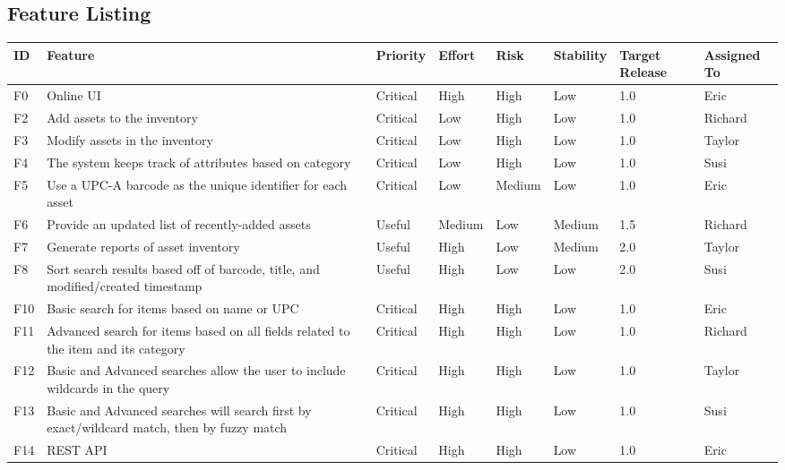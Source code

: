 \documentclass{article}
\begin{document}
\subsection{Feature Listing}
\begin{tabular}{ | p{0.15in} | p{2.0in} | p{0.5in} | p{0.5in} | p{0.5in} | p{0.6in} | p{0.5in} | p{0.65in} | }
\hline
\textbf{ID} & \textbf{Feature}\label{feature} & \textbf{Priority}\label{priority} & \textbf{Effort}\label{effort} & \textbf{Risk}\label{risk} & \textbf{Stability}\label{stability} & \textbf{Target Release}\label{target_release} & \textbf{Assigned To}\label{assigned_to} \\
\hline
\hline
F0 & Online UI & Critical & High & High & Low & 1.0 & Eric \\
\hline
F2 & Add assets to the inventory & Critical & Low & High & Low & 1.0 & Richard \\
\hline
F3 & Modify assets in the inventory & Critical & Low & High & Low & 1.0 & Taylor \\
\hline
F4 & The system keeps track of attributes based on category & Critical & Low & High & Low & 1.0 & Susi \\
\hline
F5 & Use a UPC-A barcode as the unique identifier for each asset\label{upc} & Critical & Low & Medium & Low & 1.0 & Eric \\
\hline
F6 & Provide an updated list of recently-added assets & Useful & Medium & Low & Medium & 1.5 & Richard \\
\hline
F7 & Generate reports of asset inventory & Useful & High & Low & Medium & 2.0 & Taylor \\
\hline
F8 & Sort search results based off of barcode, title, and modified/created timestamp & Useful & High & Low & Low & 2.0 & Susi \\
\hline
F10 & Basic search for items based on name or UPC & Critical & High & High & Low & 1.0 & Eric \\
\hline
F11 & Advanced search for items based on all fields related to the item and its category & Critical & High & High & Low & 1.0 & Richard \\
\hline
F12 & Basic and Advanced searches allow the user to include wildcards in the query & Critical & High & High & Low & 1.0 & Taylor \\
\hline
F13 & Basic and Advanced searches will search first by exact/wildcard match, then by fuzzy match & Critical & High & High & Low & 1.0 & Susi \\
\hline
F14 & REST API & Critical & High & High & Low & 1.0 & Eric \\
\hline
\end{tabular}\\
\end{document}
